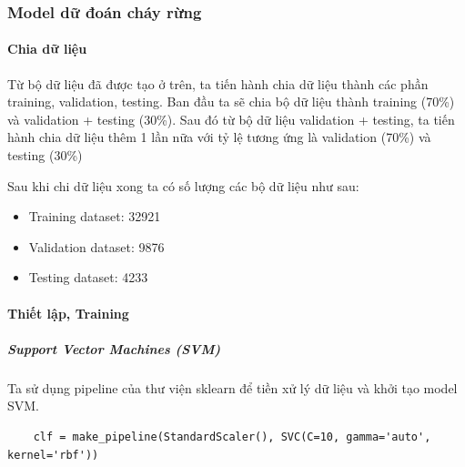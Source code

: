 \documentclass{article}
\begin{document}
\subsubsection{Model dữ đoán cháy rừng}
\paragraph{Chia dữ liệu}


Từ bộ dữ liệu đã được tạo ở trên, ta tiến hành chia dữ liệu thành các phần training, validation, testing. Ban đầu ta sẽ chia bộ dữ liệu thành training (70\%) và validation + testing (30\%). Sau đó từ bộ dữ liệu validation + testing, ta tiến hành chia dữ liệu thêm 1 lần nữa với tỷ lệ tương ứng là validation (70\%) và testing (30\%)

Sau khi chi dữ liệu xong ta có số lượng các bộ dữ liệu như sau:

\begin{itemize}
	\item Training dataset: 32921
	\item Validation dataset: 9876
	\item Testing dataset: 4233
\end{itemize}

\paragraph{Thiết lập, Training}
\subparagraph{Support Vector Machines (SVM)}


Ta sử dụng pipeline của thư viện sklearn để tiền xử lý dữ liệu và khởi tạo model SVM.

\begin{verbatim}
	clf = make_pipeline(StandardScaler(), SVC(C=10, gamma='auto', kernel='rbf'))
\end{verbatim}
\end{document}
